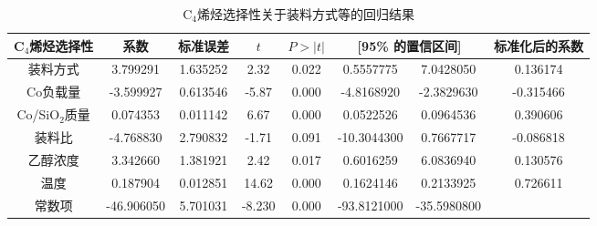 \documentclass[a4paper,10.5pt]{ctexart}
\begin{document}
\begin{table}[htbp]
  \centering
  \caption{C$_4$烯烃选择性关于装料方式等的回归结果}
    \begin{tabular}{cccccccc}
    \toprule[2pt]
     C$_4$烯烃选择性 & 系数 & 标准误差  &  $t$    & $P>|t|$ & \multicolumn{2}{c}{ [95\% 的置信区间]} & 标准化后的系数 \\
    \midrule
    装料方式  & 3.799291  & 1.635252  & 2.32  & 0.022  & 0.5557775  & 7.0428050  & 0.136174  \\
     Co负载量 & -3.599927  & 0.613546  & -5.87  & 0.000  & -4.8168920  & -2.3829630  & -0.315466  \\
     Co/SiO$_2$质量 & 0.074353  & 0.011142  & 6.67  & 0.000  & 0.0522526  & 0.0964536  & 0.390606  \\
     装料比  & -4.768830  & 2.790832  & -1.71  & 0.091  & -10.3044300  & 0.7667717  & -0.086818  \\
     乙醇浓度  & 3.342660  & 1.381921  & 2.42  & 0.017  & 0.6016259  & 6.0836940  & 0.130576  \\
     温度   & 0.187904  & 0.012851  & 14.62  & 0.000  & 0.1624146  & 0.2133925  & 0.726611  \\
     常数项  & -46.906050  & 5.701031  & -8.230  & 0.000  & -93.8121000  & -35.5980800  &  \\
    \bottomrule[2pt]
    \end{tabular}%
  \label{tab:addlabel}%
\end{table}%
\end{document}
